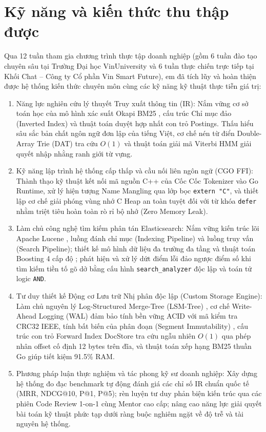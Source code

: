 \documentclass[12pt,a4paper,oneside]{report}
\begin{document}
\section{Kỹ năng và kiến thức thu thập được}
Qua 12 tuần tham gia chương trình thực tập doanh nghiệp (gồm 6 tuần đào tạo chuyên sâu tại Trường Đại học VinUniversity và 6 tuần thực chiến trực tiếp tại Khối Chat -- Công ty Cổ phần Vin Smart Future), em đã tích lũy và hoàn thiện được hệ thống kiến thức chuyên môn cùng các kỹ năng kỹ thuật thực tiễn giá trị:
\begin{enumerate}
    \item Năng lực nghiên cứu lý thuyết Truy xuất thông tin (IR): Nắm vững cơ sở toán học của mô hình xác suất Okapi BM25 \cite{ref2}, cấu trúc Chỉ mục đảo (Inverted Index) \cite{ref1} và thuật toán duyệt hợp nhất con trỏ Postings. Thấu hiểu sâu sắc bản chất ngôn ngữ đơn lập của tiếng Việt, cơ chế nén từ điển Double-Array Trie (DAT) \cite{ref10} tra cứu $O(1)$ và thuật toán giải mã Viterbi HMM \cite{ref5} giải quyết nhập nhằng ranh giới từ vựng.
    \item Kỹ năng lập trình hệ thống cấp thấp và cầu nối liên ngôn ngữ (CGO FFI): Thành thạo kỹ thuật kết nối mã nguồn C++ của Cốc Cốc Tokenizer vào Go Runtime, xử lý hiện tượng Name Mangling qua lớp bọc \texttt{extern "C"}, và thiết lập cơ chế giải phóng vùng nhớ C Heap an toàn tuyệt đối với từ khóa \texttt{defer} nhằm triệt tiêu hoàn toàn rò rỉ bộ nhớ (Zero Memory Leak).
    \item Làm chủ công nghệ tìm kiếm phân tán Elasticsearch: Nắm vững kiến trúc lõi Apache Lucene \cite{ref8}, luồng đánh chỉ mục (Indexing Pipeline) và luồng truy vấn (Search Pipeline); thiết kế mô hình dữ liệu đa trường đa tầng và thuật toán Boosting 4 cấp độ \cite{ref4}; phát hiện và xử lý dứt điểm lỗi đảo ngược điểm số khi tìm kiếm tiền tố gõ dở bằng cấu hình \texttt{search\_analyzer} độc lập và toán tử logic \texttt{AND}.
    \item Tư duy thiết kế Động cơ Lưu trữ Nhị phân độc lập (Custom Storage Engine): Làm chủ nguyên lý Log-Structured Merge-Tree (LSM-Tree) \cite{ref3}, cơ chế Write-Ahead Logging (WAL) đảm bảo tính bền vững ACID với mã kiểm tra CRC32 IEEE, tính bất biến của phân đoạn (Segment Immutability) \cite{ref8}, cấu trúc con trỏ Forward Index DocStore tra cứu ngẫu nhiên $O(1)$ qua phép nhân offset cố định 12 bytes trên đĩa, và thuật toán xếp hạng BM25 thuần Go \cite{ref2} giúp tiết kiệm 91.5\% RAM.
    \item Phương pháp luận thực nghiệm và tác phong kỹ sư doanh nghiệp: Xây dựng hệ thống đo đạc benchmark tự động đánh giá các chỉ số IR chuẩn quốc tế (MRR, NDCG@10, P@1, P@5); rèn luyện tư duy phản biện kiến trúc qua các phiên Code Review 1-on-1 cùng Mentor cao cấp; nâng cao năng lực giải quyết bài toán kỹ thuật phức tạp dưới ràng buộc nghiêm ngặt về độ trễ và tài nguyên hệ thống.
\end{enumerate}
\end{document}
